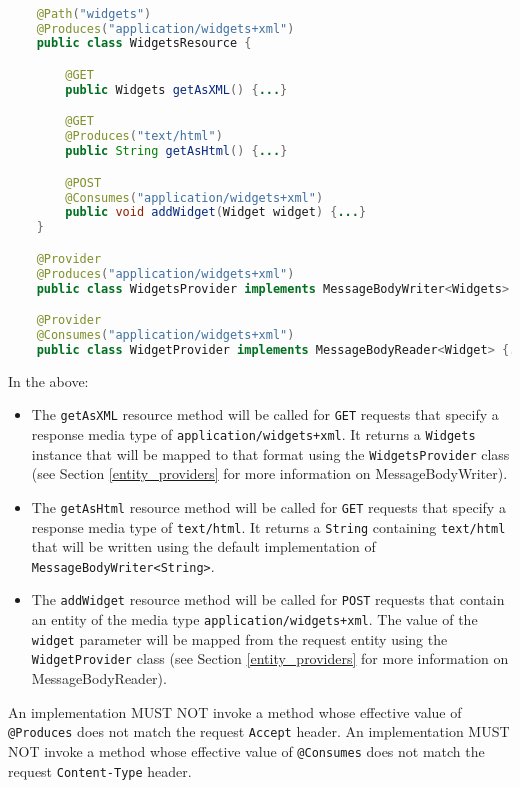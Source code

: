 \begin{lstlisting}[language=Java]

    @Path("widgets")
    @Produces("application/widgets+xml")
    public class WidgetsResource {

        @GET
        public Widgets getAsXML() {...}

        @GET
        @Produces("text/html")
        public String getAsHtml() {...}

        @POST
        @Consumes("application/widgets+xml")
        public void addWidget(Widget widget) {...}
    }

    @Provider
    @Produces("application/widgets+xml")
    public class WidgetsProvider implements MessageBodyWriter<Widgets> {...}

    @Provider
    @Consumes("application/widgets+xml")
    public class WidgetProvider implements MessageBodyReader<Widget> {...}
\end{lstlisting}

In the above:
\begin{itemize}
    \item The \lstinline{getAsXML} resource method will be called for \lstinline{GET} requests that specify a response
    media type of \lstinline{application/widgets+xml}. It returns a \lstinline{Widgets} instance that will be mapped to
    that format using the \lstinline{WidgetsProvider} class (see Section \ref{entity_providers} for more information on
    MessageBodyWriter).
    \item The \lstinline{getAsHtml} resource method will be called for \lstinline{GET} requests that specify a response
    media type of \lstinline{text/html}. It returns a \lstinline{String} containing \lstinline{text/html} that will be
    written using the default implementation of \lstinline{MessageBodyWriter<String>}.
    \item The \lstinline{addWidget} resource method will be called for \lstinline{POST} requests that contain an entity
    of the media type \lstinline{application/widgets+xml}. The value of the \lstinline{widget} parameter will be mapped
    from the request entity using the \lstinline{WidgetProvider} class (see Section \ref{entity_providers} for more
    information on MessageBodyReader).
\end{itemize}

An implementation MUST NOT invoke a method whose effective value of \lstinline{@Produces} does not match the request
\lstinline{Accept} header. An implementation MUST NOT invoke a method whose effective value of \lstinline{@Consumes}
does not match the request \lstinline{Content-Type} header.

